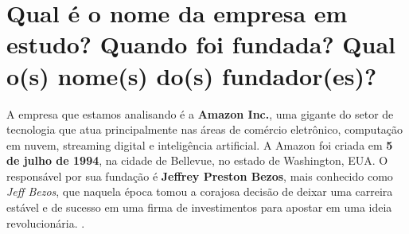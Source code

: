 \section{Qual é o nome da empresa em estudo? Quando foi fundada? Qual o(s) nome(s) do(s) fundador(es)?}

A empresa que estamos analisando é a \textbf{Amazon Inc.}, uma gigante do setor de tecnologia que atua principalmente nas áreas de comércio eletrônico, computação em nuvem, streaming digital e inteligência artificial. A Amazon foi criada em \textbf{5 de julho de 1994}, na cidade de Bellevue, no estado de Washington, EUA. O responsável por sua fundação é \textbf{Jeffrey Preston Bezos}, mais conhecido como \textit{Jeff Bezos}, que naquela época tomou a corajosa decisão de deixar uma carreira estável e de sucesso em uma firma de investimentos para apostar em uma ideia revolucionária.  \cite{bezosbiography2024}.